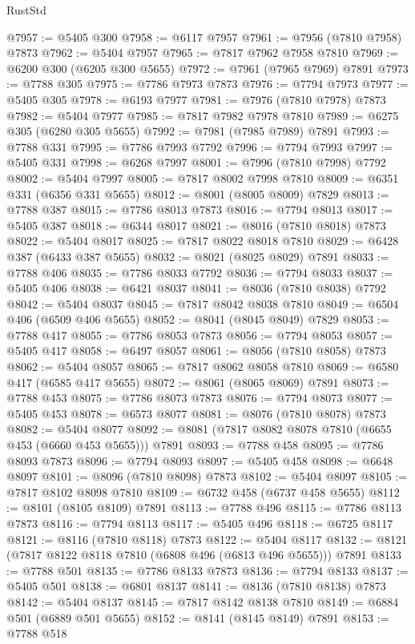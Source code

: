 \begin{lexlean}{RustStd}
\begin{coremodule}
@7957 := @5405 @300
@7958 := @6117 @7957
@7961 := @7956 (@7810 @7958) @7873
@7962 := @5404 @7957
@7965 := @7817 @7962 @7958 @7810
@7969 := @6200 @300 (@6205 @300 @5655)
@7972 := @7961 (@7965 @7969) @7891
@7973 := @7788 @305
@7975 := @7786 @7973 @7873
@7976 := @7794 @7973
@7977 := @5405 @305
@7978 := @6193 @7977
@7981 := @7976 (@7810 @7978) @7873
@7982 := @5404 @7977
@7985 := @7817 @7982 @7978 @7810
@7989 := @6275 @305 (@6280 @305 @5655)
@7992 := @7981 (@7985 @7989) @7891
@7993 := @7788 @331
@7995 := @7786 @7993 @7792
@7996 := @7794 @7993
@7997 := @5405 @331
@7998 := @6268 @7997
@8001 := @7996 (@7810 @7998) @7792
@8002 := @5404 @7997
@8005 := @7817 @8002 @7998 @7810
@8009 := @6351 @331 (@6356 @331 @5655)
@8012 := @8001 (@8005 @8009) @7829
@8013 := @7788 @387
@8015 := @7786 @8013 @7873
@8016 := @7794 @8013
@8017 := @5405 @387
@8018 := @6344 @8017
@8021 := @8016 (@7810 @8018) @7873
@8022 := @5404 @8017
@8025 := @7817 @8022 @8018 @7810
@8029 := @6428 @387 (@6433 @387 @5655)
@8032 := @8021 (@8025 @8029) @7891
@8033 := @7788 @406
@8035 := @7786 @8033 @7792
@8036 := @7794 @8033
@8037 := @5405 @406
@8038 := @6421 @8037
@8041 := @8036 (@7810 @8038) @7792
@8042 := @5404 @8037
@8045 := @7817 @8042 @8038 @7810
@8049 := @6504 @406 (@6509 @406 @5655)
@8052 := @8041 (@8045 @8049) @7829
@8053 := @7788 @417
@8055 := @7786 @8053 @7873
@8056 := @7794 @8053
@8057 := @5405 @417
@8058 := @6497 @8057
@8061 := @8056 (@7810 @8058) @7873
@8062 := @5404 @8057
@8065 := @7817 @8062 @8058 @7810
@8069 := @6580 @417 (@6585 @417 @5655)
@8072 := @8061 (@8065 @8069) @7891
@8073 := @7788 @453
@8075 := @7786 @8073 @7873
@8076 := @7794 @8073
@8077 := @5405 @453
@8078 := @6573 @8077
@8081 := @8076 (@7810 @8078) @7873
@8082 := @5404 @8077
@8092 := @8081 (@7817 @8082 @8078 @7810 (@6655 @453 (@6660 @453 @5655))) @7891
@8093 := @7788 @458
@8095 := @7786 @8093 @7873
@8096 := @7794 @8093
@8097 := @5405 @458
@8098 := @6648 @8097
@8101 := @8096 (@7810 @8098) @7873
@8102 := @5404 @8097
@8105 := @7817 @8102 @8098 @7810
@8109 := @6732 @458 (@6737 @458 @5655)
@8112 := @8101 (@8105 @8109) @7891
@8113 := @7788 @496
@8115 := @7786 @8113 @7873
@8116 := @7794 @8113
@8117 := @5405 @496
@8118 := @6725 @8117
@8121 := @8116 (@7810 @8118) @7873
@8122 := @5404 @8117
@8132 := @8121 (@7817 @8122 @8118 @7810 (@6808 @496 (@6813 @496 @5655))) @7891
@8133 := @7788 @501
@8135 := @7786 @8133 @7873
@8136 := @7794 @8133
@8137 := @5405 @501
@8138 := @6801 @8137
@8141 := @8136 (@7810 @8138) @7873
@8142 := @5404 @8137
@8145 := @7817 @8142 @8138 @7810
@8149 := @6884 @501 (@6889 @501 @5655)
@8152 := @8141 (@8145 @8149) @7891
@8153 := @7788 @518

\end{coremodule}
\end{lexlean}
